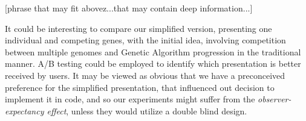 \documentclass[]{article}
\begin{document}
[phrase that may fit above^^:...that may contain deep information...]



It could be interesting to compare our simplified version, presenting one individual and competing genes, with the initial idea, involving competition between multiple genomes and Genetic Algorithm progression in the traditional manner.  A/B testing could be employed to identify which presentation is better received by users.  It may be viewed as obvious that we have a preconceived preference for the simplified presentation, that influenced out decision to implement it in code, and so our experiments might suffer from the \textit{observer-expectancy effect}, unless they would utilize a double blind design.
\end{document}
